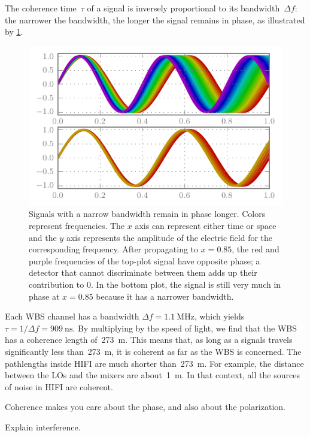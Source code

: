 The coherence time~$\tau$ of a signal is inversely proportional to its bandwidth~$\Delta f$:
the narrower the bandwidth, the longer the signal remains in phase, as illustrated by \cref{fig:coherence}.
\begin{figure}[hbtp]
    \centering
    \includegraphics{coherence}
    \caption{
        Signals with a narrow bandwidth remain in phase longer.
        Colors represent frequencies.
        The $x$ axis can represent either time or space and the $y$ axis represents the amplitude of the electric field for the corresponding frequency.
        After propagating to $x=0.85$, the red and purple frequencies of the top-plot signal have opposite phase; a detector that cannot discriminate between them adds up their contribution to 0.
        In the bottom plot, the signal is still very much in phase at $x=0.85$
        because it has a narrower bandwidth.
    }
    \label{fig:coherence}
\end{figure}

Each WBS channel has a bandwidth $\Delta f = \SI{1.1}{\mega\hertz}$,
which yields $\tau = 1 / \Delta f = \SI{909}{\nano\second}$.
By multiplying by the speed of light, we find that the WBS has a coherence length of~\SI{273}{\meter}.
This means that, as long as a signals travels significantly less than~\SI{273}{\meter}, it is coherent as far as the WBS is concerned.
The pathlengths inside HIFI are much shorter than~\SI{273}{\meter}.
For example, the distance between the LOs and the mixers are about~\SI{1}{\meter}.
In that context, all the sources of noise in HIFI are coherent.

Coherence makes you care about the phase, and also about the polarization.

Explain interference.

